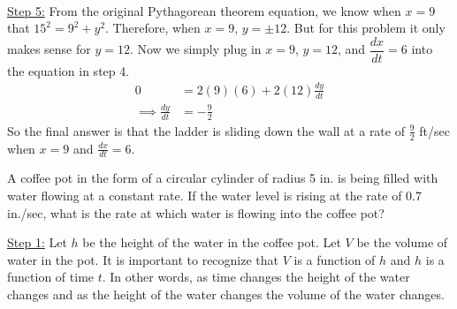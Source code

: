 \documentclass[11pt]{exam}
\begin{document}
\begin{questions}
\begin{solution}
\begin{align*}
\end{align*}
\underline{Step 5:} From the original Pythagorean theorem equation, we know when $x =9$ that $15^2 =9^2+y^2$. Therefore, when $x=9$, $y=\pm12$. But for this problem it only makes sense for $y=12$. Now we simply plug in $x=9$, $y=12$, and $\dfrac{dx}{dt}=6$ into the equation in step 4. 
\begin{align*}
0&=2(9)(6)+2(12)\frac{dy}{dt}\\
\implies \frac{dy}{dt}&=-\frac{9}{2}
\end{align*}
So the final answer is that the ladder is sliding down the wall at a rate of $\frac{9}{2}$ ft/sec when $x=9$ and $\frac{dx}{dt}=6$. 
\end{solution}
\question A coffee pot in the form of a circular cylinder of radius 5 in. is being filled with water flowing at a constant rate. If the water level is rising at the rate of 0.7 in./sec, what is the rate at which water is flowing into the coffee pot?
\begin{center}
\end{center}
\begin{solution}
\underline{Step 1:}
Let $h$ be the height of the water in the coffee pot. Let $V$ be the volume of water in the pot. It is important to recognize that $V$ is a function of $h$ and $h$ is a function of time $t$. In other words, as time changes the height of the water changes and as the height of the water changes the volume of the water changes. 


\end{solution}
\end{questions}
\end{document}

